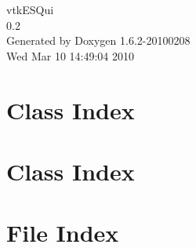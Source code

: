 \documentclass[a4paper]{book}
\begin{document}
\hypersetup{pageanchor=false}
\begin{titlepage}
\vspace*{7cm}
\begin{center}
{\Large vtkESQui \\[1ex]\large 0.2 }\\
\vspace*{1cm}
{\large Generated by Doxygen 1.6.2-20100208}\\
\vspace*{0.5cm}
{\small Wed Mar 10 14:49:04 2010}\\
\end{center}
\end{titlepage}
\clearemptydoublepage
{}
\tableofcontents
\clearemptydoublepage
{}
\hypersetup{pageanchor=true}
\chapter{Class Index}

\chapter{Class Index}

\chapter{File Index}

\end{document}
